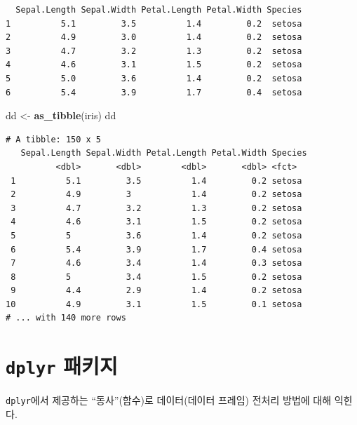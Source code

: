 \documentclass[
  11pt,
]{krantz}
\makeatletter
\newenvironment{Shaded}{\begin{snugshade}}{\end{snugshade}}
\newcommand{\KeywordTok}[1]{\textcolor[rgb]{0.27,0.27,0.27}{\textbf{#1}}}
\newcommand{\NormalTok}[1]{#1}
\newcommand{\StringTok}[1]{\textcolor[rgb]{0.5,0.5,0.5}{#1}}
\newenvironment{kframe}{%
\medskip{}
\setlength{\fboxsep}{.8em}
 \def\at@end@of@kframe{}%
 \ifinner\ifhmode%
  \def\at@end@of@kframe{\end{minipage}}%
  \begin{minipage}{\columnwidth}%
 \fi\fi%
 \def\FrameCommand##1{\hskip\@totalleftmargin \hskip-\fboxsep
 \colorbox{shadecolor}{##1}\hskip-\fboxsep
     \hskip-\linewidth \hskip-\@totalleftmargin \hskip\columnwidth}%
 \MakeFramed {\advance\hsize-\width
   \@totalleftmargin\z@ \linewidth\hsize
   \@setminipage}}%
 {\par\unskip\endMakeFramed%
 \at@end@of@kframe}
\newenvironment{rmdblock}[1]
  {
  \begin{itemize}
  \renewcommand{\labelitemi}{
    \raisebox{-.7\height}[0pt][0pt]{
      {\setkeys{Gin}{width=3em,keepaspectratio}\texttt{[image: images/\#1]}}
    }
  }
  \setlength{\fboxsep}{1em}
  \begin{kframe}
  \item
  }
  {
  \end{kframe}
  \end{itemize}
  }
\newenvironment{rmdnote}
  {\begin{rmdblock}{note}}
  {\end{rmdblock}}
\makeatother
\begin{document}
\begin{verbatim}
  Sepal.Length Sepal.Width Petal.Length Petal.Width Species
1          5.1         3.5          1.4         0.2  setosa
2          4.9         3.0          1.4         0.2  setosa
3          4.7         3.2          1.3         0.2  setosa
4          4.6         3.1          1.5         0.2  setosa
5          5.0         3.6          1.4         0.2  setosa
6          5.4         3.9          1.7         0.4  setosa
\end{verbatim}

\begin{Shaded}
\begin{Highlighting}[]
\NormalTok{dd <-}\StringTok{ }\KeywordTok{as_tibble}\NormalTok{(iris)}
\NormalTok{dd}
\end{Highlighting}
\end{Shaded}

\begin{verbatim}
# A tibble: 150 x 5
   Sepal.Length Sepal.Width Petal.Length Petal.Width Species
          <dbl>       <dbl>        <dbl>       <dbl> <fct>  
 1          5.1         3.5          1.4         0.2 setosa 
 2          4.9         3            1.4         0.2 setosa 
 3          4.7         3.2          1.3         0.2 setosa 
 4          4.6         3.1          1.5         0.2 setosa 
 5          5           3.6          1.4         0.2 setosa 
 6          5.4         3.9          1.7         0.4 setosa 
 7          4.6         3.4          1.4         0.3 setosa 
 8          5           3.4          1.5         0.2 setosa 
 9          4.4         2.9          1.4         0.2 setosa 
10          4.9         3.1          1.5         0.1 setosa 
# ... with 140 more rows
\end{verbatim}

\normalsize

\hypertarget{dplyr}{%
\section{\texorpdfstring{\texttt{dplyr} 패키지}{dplyr 패키지}}\label{dplyr}}

\footnotesize

\begin{rmdnote}
\begin{rmdnote}

\texttt{dplyr}에서 제공하는 ``동사''(함수)로 데이터(데이터 프레임) 전처리 방법에 대해 익힌다.

\end{rmdnote}
\end{rmdnote}
\end{document}
